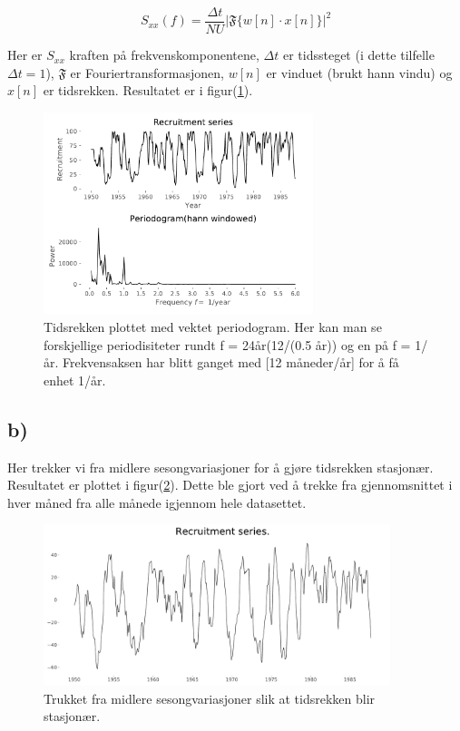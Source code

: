 \begin{equation}
    S_{xx}(f) = \frac{\Delta t}{NU}\bigg |\mathfrak{F}\bigg\{w[n]\cdot x[n]\bigg\}\bigg |^{2}
    \label{vektet periodogram}
\end{equation}

Her er $S_{xx}$ kraften på frekvenskomponentene, $\Delta t$ er tidssteget (i dette tilfelle $\Delta t = 1$), $\mathfrak{F}$ er Fouriertransformasjonen, $w[n]$ er vinduet (brukt hann vindu) og $x[n]$ er tidsrekken. Resultatet er i figur(\ref{task_a}).

\begin{figure}[hbt!]
{\centering
    \includegraphics[width=0.70\textwidth]{task_a.pdf}
    \caption{Tidsrekken plottet med vektet periodogram. Her kan man se forskjellige periodisiteter rundt f = 24år(12/(0.5 år)) og en på f = 1/år. Frekvensaksen har blitt ganget med [12 måneder/år] for å få enhet 1/år.}
    \label{task_a}
\par}
\end{figure}


\subsection{b)}

Her trekker vi fra midlere sesongvariasjoner for å gjøre tidsrekken stasjonær. Resultatet er plottet i figur(\ref{task_b}). Dette ble gjort ved å trekke fra gjennomsnittet i hver måned fra alle månede igjennom hele datasettet.

\begin{figure}[hbt!]
    {\centering
        \includegraphics[width=0.90\textwidth]{task_b.pdf}
        \caption{Trukket fra midlere sesongvariasjoner slik at tidsrekken blir stasjonær.}
        \label{task_b}
    \par}
    \end{figure}


